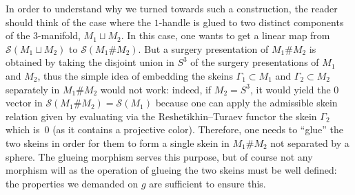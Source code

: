\documentclass[10pt,a4paper]{amsart}
\numberwithin{equation}{section}
\numberwithin{theorem}{section}
\numberwithin{proposition}{section}
\numberwithin{definition}{section}
\numberwithin{lemma}{section}
\numberwithin{corollary}{section}
\numberwithin{remark}{section}
\numberwithin{example}{section}
\newcommand{\TSkein}{{\mathscr{S}}}
\begin{document}
\begin{remark}
 In order to understand why we turned towards such a construction,
 the reader should think of the case where the $1$-handle is glued to
 two distinct components of the $3$-manifold, $M_1\sqcup M_2$. In
 this case, one wants to get a linear map from
 $\TSkein(M_1\sqcup M_2)$ to $\TSkein(M_1\#M_2)$. But a surgery
 presentation of $M_1\#M_2$ is obtained by taking the disjoint union
 in $S^3$ of the surgery presentations of $M_1$ and $M_2$, thus the
 simple idea of embedding the skeins $\Gamma_1\subset M_1$ and
 $\Gamma_2\subset M_2$
 separately in $M_1\#M_2$ would not work: indeed, if $M_2=S^3$, it would yield the $0$ vector in
 $\TSkein(M_1\#M_2)=\TSkein(M_1)$ because one can apply the admissible skein
 relation given by evaluating via the Reshetikhin--Turaev functor the
 skein $\Gamma_2$ which is~$0$ (as it contains a projective color).
 Therefore, one needs to ``glue'' the two skeins in order for them to
 form a single skein in $M_1\#M_2$ not separated by a sphere. The
 glueing morphism serves this purpose, but of course not any morphism
 will as the operation of glueing the two skeins must be well
 defined: the properties we demanded on $g$ are sufficient to ensure
 this.
\end{remark}
\end{document}
